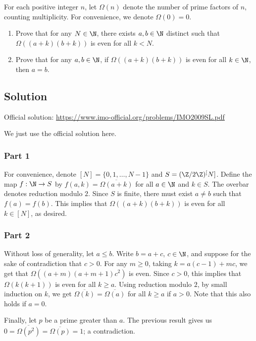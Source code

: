 For each positive integer $n$, let $\Omega(n)$ denote the number of prime factors of $n$, counting multiplicity.
For convenience, we denote $\Omega(0) = 0$.
\begin{enumerate}
    \item Prove that for any $N \in \N$, there exists $a, b \in \N$ distinct such that $\Omega((a + k)(b + k))$ is even for all $k < N$.
    \item Prove that for any $a, b \in \N$, if $\Omega((a + k)(b + k))$ is even for all $k \in \N$, then $a = b$.
\end{enumerate}



\subsection*{Solution}

Official solution: \url{https://www.imo-official.org/problems/IMO2009SL.pdf}

We just use the official solution here.



\subsubsection*{Part 1}

For convenience, denote $[N] = \{0, 1, \ldots, N - 1\}$ and $S = (\Z/2\Z)^[N]$.
Define the map $f : \N \to S$ by $f(a, k) = \overline{\Omega(a + k)}$ for all $a \in \N$ and $k \in S$.
The overbar denotes reduction modulo $2$.
Since $S$ is finite, there must exist $a \neq b$ such that $f(a) = f(b)$.
This implies that $\Omega((a + k)(b + k))$ is even for all $k \in [N]$, as desired.


\subsubsection*{Part 2}

Without loss of generality, let $a \leq b$.
Write $b = a + c$, $c \in \N$, and suppose for the sake of contradiction that $c > 0$.
For any $m \geq 0$, taking $k = a(c - 1) + mc$, we get that $\Omega((a + m)(a + m + 1) c^2)$ is even.
Since $c > 0$, this implies that $\Omega(k(k + 1))$ is even for all $k \geq a$.
Using reduction modulo $2$, by small induction on $k$, we get $\overline{\Omega(k)} = \overline{\Omega(a)}$ for all $k \geq a$ if $a > 0$.
Note that this also holds if $a = 0$.

Finally, let $p$ be a prime greater than $a$.
The previous result gives us $0 = \overline{\Omega(p^2)} = \overline{\Omega(p)} = 1$; a contradiction.
